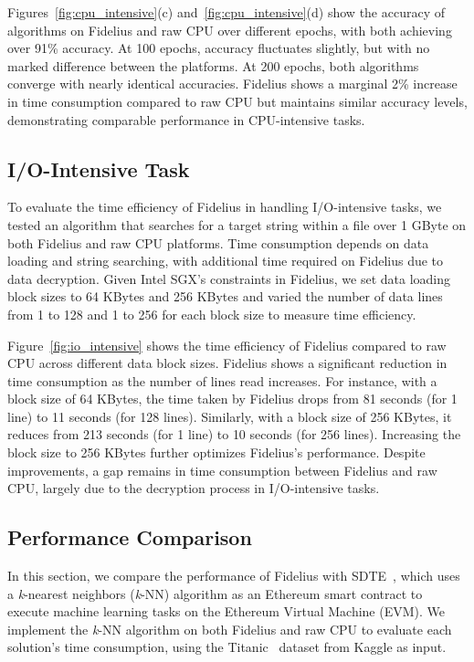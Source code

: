 Figures~\ref{fig:cpu_intensive}(c) and~\ref{fig:cpu_intensive}(d) show the accuracy of algorithms on Fidelius and raw CPU over different epochs, with both achieving over 91\% accuracy. At 100 epochs, accuracy fluctuates slightly, but with no marked difference between the platforms. At 200 epochs, both algorithms converge with nearly identical accuracies. Fidelius shows a marginal 2\% increase in time consumption compared to raw CPU but maintains similar accuracy levels, demonstrating comparable performance in CPU-intensive tasks.


\subsection{I/O-Intensive Task}\label{subsec:io_intensive}
To evaluate the time efficiency of Fidelius in handling I/O-intensive tasks, we tested an algorithm that searches for a target string within a file over 1 GByte on both Fidelius and raw CPU platforms. Time consumption depends on data loading and string searching, with additional time required on Fidelius due to data decryption. Given Intel SGX's constraints in Fidelius, we set data loading block sizes to 64 KBytes and 256 KBytes and varied the number of data lines from 1 to 128 and 1 to 256 for each block size to measure time efficiency.



Figure~\ref{fig:io_intensive} shows the time efficiency of Fidelius compared to raw CPU across different data block sizes. Fidelius shows a significant reduction in time consumption as the number of lines read increases. For instance, with a block size of 64 KBytes, the time taken by Fidelius drops from 81 seconds (for 1 line) to 11 seconds (for 128 lines). Similarly, with a block size of 256 KBytes, it reduces from 213 seconds (for 1 line) to 10 seconds (for 256 lines). Increasing the block size to 256 KBytes further optimizes Fidelius's performance. Despite improvements, a gap remains in time consumption between Fidelius and raw CPU, largely due to the decryption process in I/O-intensive tasks.

\subsection{Performance Comparison}\label{subsec:evm_cmp}
In this section, we compare the performance of Fidelius with SDTE~\cite{dai2019sdte}, which uses a \textit{k}-nearest neighbors (\textit{k}-NN) algorithm as an Ethereum smart contract to execute machine learning tasks on the Ethereum Virtual Machine (EVM). We implement the \textit{k}-NN algorithm on both Fidelius and raw CPU to evaluate each solution's time consumption, using the Titanic~\cite{titanic} dataset from Kaggle as input.

